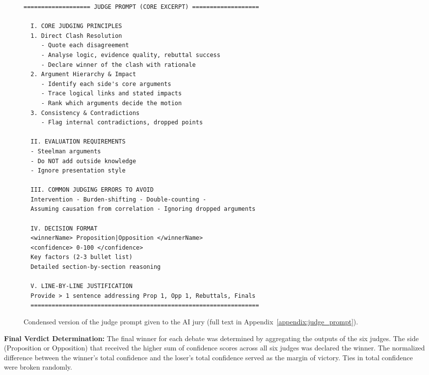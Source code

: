 \documentclass{article}
\begin{document}
\begin{figure}[htbp]           %
    \centering
    \lstset{style=promptstyle}
    \begin{adjustbox}{max height=0.45\textheight}
    \begin{lstlisting}[language={}]
  =================== JUDGE PROMPT (CORE EXCERPT) ===================

  I. CORE JUDGING PRINCIPLES
  1. Direct Clash Resolution
     - Quote each disagreement
     - Analyse logic, evidence quality, rebuttal success
     - Declare winner of the clash with rationale
  2. Argument Hierarchy & Impact
     - Identify each side's core arguments
     - Trace logical links and stated impacts
     - Rank which arguments decide the motion
  3. Consistency & Contradictions
     - Flag internal contradictions, dropped points

  II. EVALUATION REQUIREMENTS
  - Steelman arguments
  - Do NOT add outside knowledge
  - Ignore presentation style

  III. COMMON JUDGING ERRORS TO AVOID
  Intervention - Burden-shifting - Double-counting -
  Assuming causation from correlation - Ignoring dropped arguments

  IV. DECISION FORMAT
  <winnerName> Proposition|Opposition </winnerName>
  <confidence> 0-100 </confidence>
  Key factors (2-3 bullet list)
  Detailed section-by-section reasoning

  V. LINE-BY-LINE JUSTIFICATION
  Provide > 1 sentence addressing Prop 1, Opp 1, Rebuttals, Finals
  =================================================================
    \end{lstlisting}
    \end{adjustbox}

    \caption{Condensed version of the judge prompt given to the AI jury
    (full text in Appendix~\ref{appendix:judge_prompt}).}
    \label{fig:judge-prompt}
  \end{figure}


\textbf{Final Verdict Determination:} The final winner for each debate was determined by aggregating the outputs of the six judges. The side (Proposition or Opposition) that received the higher sum of confidence scores across all six judges was declared the winner. The normalized difference between the winner's total confidence and the loser's total confidence served as the margin of victory. Ties in total confidence were broken randomly.
\end{document}
